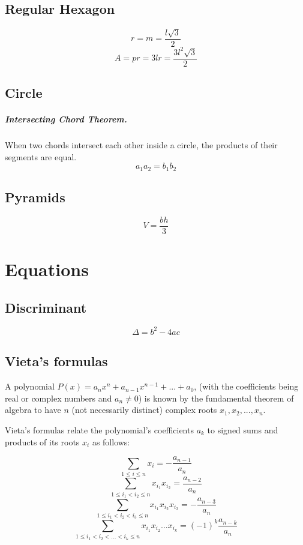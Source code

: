 \documentclass[oneside]{book} %
\theoremstyle{plain}
\begin{document}
\section{Regular Hexagon}

\[r = m = \frac{l \sqrt{3}}{2}\]
\[A = pr = 3 l r = \frac{3 l^2 \sqrt{3}}{2}\]

\section{Circle}
\paragraph{Intersecting Chord Theorem.} When two chords intersect each
other inside a circle, the products of their segments are equal.
\[a_1 a_2 = b_1 b_2\]

\section{Pyramids}
\[V = \frac{bh}{3}\]


\chapter{Equations}
\section{Discriminant}
\[\Delta = b^2 - 4ac\]

\section{Vieta's formulas}
A polynomial \(P(x) = a_n x^n + a_{n-1} x^{n-1} + ... + a_0\), (with the
coefficients being real or complex numbers and \(a_n \neq 0\)) is known by the
fundamental theorem of algebra to have \(n\) (not necessarily distinct) complex
roots \(x_1, x_2, ..., x_n\).

Vieta's formulas relate the polynomial's coefficients \(a_k\) to signed sums
and products of its roots \(x_i\) as follows:

\[\sum_{1 \le i \le n} x_i = - \frac{a_{n-1}}{a_n}\]
\[\sum_{1 \le i_1 < i_2 \le n} x_{i_1} x_{i_2} = \frac{a_{n-2}}{a_n}\]
\[\sum_{1 \le i_1 < i_2 < i_3 \le n} x_{i_1} x_{i_2} x_{i_3} = -
\frac{a_{n-3}}{a_n}\]
\[\sum_{1 \le i_1 < i_2 < ... < i_k \le n} x_{i_1} x_{i_2} ... x_{i_k} = (-1)^k
\frac{a_{n-k}}{a_n}\]
\end{document}
